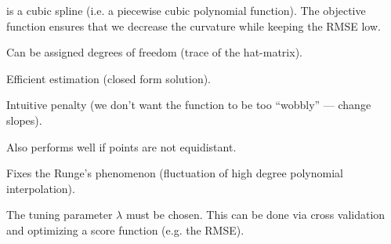 		is a %
		cubic spline (i.e. a piecewise cubic polynomial function).
		The objective function ensures that we decrease the curvature while keeping the RMSE low.


		\begin{my_pros_cons_table}{
				\item Can be assigned degrees of freedom (trace of the hat-matrix).
				\item Efficient estimation (closed form solution).
				\item Intuitive penalty (we don't want the function to be too ``wobbly'' --- change slopes).
				\item Also performs well if points are not equidistant.
				\item Fixes the Runge's phenomenon (fluctuation of high degree polynomial interpolation).
			}{
				\item The tuning parameter $\lambda$ must be chosen. This can be done via cross validation and optimizing a score function (e.g. the RMSE). 
			}
		\end{my_pros_cons_table}



